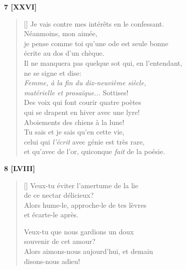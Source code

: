 \documentclass[a4paper,12pt]{book}
\begin{document}
\bigskip

\begin{center}
  \textbf{7 [XXVI]}
\end{center}

\settowidth{\versewidth}{je pense comme toi qu'une ode est seule bonne}

\begin{verse}[\versewidth]
  Je vais contre mes intérêts en le confessant. \\
  Néanmoins, mon aimée, \\
  je pense comme toi qu'une ode est seule bonne \\
  écrite au dos d'un chèque. \\
  Il ne manquera pas quelque sot qui, en l'entendant, \\
  ne se signe et dise: \\
  \emph{Femme, à la fin du dix-neuvième siècle, \\
    matérielle et prosaïque...} Sottises! \\
  Des voix qui font courir quatre poètes \\
  qui se drapent en hiver avec une lyre! \\
  Aboiements des chiens à la lune! \\
  Tu sais et je sais qu'en cette vie, \\
  celui qui \emph{l'écrit} avec génie est très rare, \\
  et qu'avec de l'or, quiconque \emph{fait} de la poésie.
\end{verse}

\bigskip

\begin{center}
  \textbf{8 [LVIII]}
\end{center}

\settowidth{\versewidth}{Alors hume-le, approche-le de tes lèvres}

\begin{verse}[\versewidth]
  Veux-tu éviter l'amertume de la lie \\
  de ce nectar délicieux? \\
  Alors hume-le, approche-le de tes lèvres \\
  et écarte-le après.

  Veux-tu que nous gardions un doux \\
  souvenir de cet amour? \\
  Alors aimons-nous aujourd'hui, et demain \\
  disons-nous adieu!
\end{verse}
\end{document}
